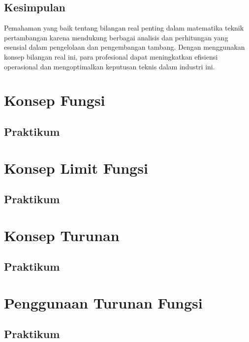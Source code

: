 \documentclass[
]{book}
\begin{document}
\section{Kesimpulan}\label{kesimpulan}

Pemahaman yang baik tentang bilangan real penting dalam matematika teknik pertambangan karena mendukung berbagai analisis dan perhitungan yang esensial dalam pengelolaan dan pengembangan tambang. Dengan menggunakan konsep bilangan real ini, para profesional dapat meningkatkan efisiensi operasional dan mengoptimalkan keputusan teknis dalam industri ini.

\chapter{Konsep Fungsi}\label{Konsep_Fungsi}

\section{Praktikum}\label{praktikum}

\chapter{Konsep Limit Fungsi}\label{Konsep_Limit_Fungsi}

\section{Praktikum}\label{praktikum-1}

\chapter{Konsep Turunan}\label{Konsep_Turunan}

\section{Praktikum}\label{praktikum-2}

\chapter{Penggunaan Turunan Fungsi}\label{Penggunaan_Turunan_Fungsi}

\section{Praktikum}\label{praktikum-3}
\end{document}
